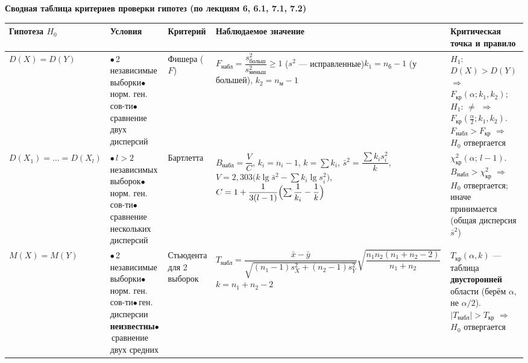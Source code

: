 \documentclass[a4paper,landscape,10pt]{extarticle}
\newcommand{\kr}{\text{кр}}\newcommand{\nab}{\text{набл}}
\newcommand{\bl}{$\bullet$\,}
\begin{document}
\begin{center}{\normalsize\bfseries Сводная таблица критериев проверки гипотез (по лекциям 6, 6.1, 7.1, 7.2)}\end{center}
\vspace{-6pt}
\renewcommand{\arraystretch}{1.12}\footnotesize
\noindent\begin{tabular}{|P{2.3cm}|P{4.6cm}|P{2.2cm}|P{7.1cm}|P{9.2cm}|}
\hline
\textbf{Гипотеза $H_0$} & \textbf{Условия} & \textbf{Критерий} & \textbf{Наблюдаемое значение} & \textbf{Критическая точка и правило} \\\hline
$D(X)=D(Y)$
&\newline\bl 2 независимые выборки\newline\bl норм. ген. сов-ти\newline\bl сравнение двух дисперсий
& Фишера ($F$)
& $F_\nab=\dfrac{s^2_{\text{больш}}}{s^2_{\text{меньш}}}\ge1$ ($s^2$ --- исправленные)\newline $k_1=n_{\text{б}}-1$ (у большей), $k_2=n_{\text{м}}-1$
& $H_1$: $D(X)>D(Y)$ $\Rightarrow$ $F_\kr(\alpha;k_1,k_2)$; \ $H_1$: $\ne$ $\Rightarrow$ $F_\kr(\frac\alpha2;k_1,k_2)$.\newline $F_\nab>F_\kr$ $\Rightarrow$ $H_0$ отвергается \\\hline
$D(X_1)=\dots=D(X_l)$
&\newline\bl $l>2$ независимых выборок\newline\bl норм. ген. сов-ти\newline\bl сравнение нескольких дисперсий
& Бартлетта
& $B_\nab=\dfrac VC$, $k_i=n_i-1$, $k=\sum k_i$, $\bar s^2=\dfrac{\sum k_is_i^2}{k}$,\newline $V=2{,}303\bigl(k\lg\bar s^2-\sum k_i\lg s_i^2\bigr)$, $C=1+\dfrac{1}{3(l-1)}\Bigl(\sum\dfrac1{k_i}-\dfrac1k\Bigr)$
& $\chi^2_\kr(\alpha;\,l-1)$.\newline $B_\nab>\chi^2_\kr$ $\Rightarrow$ $H_0$ отвергается; иначе принимается (общая дисперсия $\bar s^2$) \\\hline
$M(X)=M(Y)$
&\newline\bl 2 независимые выборки\newline\bl норм. ген. сов-ти\newline\bl ген. дисперсии \textbf{неизвестны}\newline\bl сравнение двух средних
& Стьюдента для 2 выборок
& $T_\nab=\dfrac{\bar x-\bar y}{\sqrt{(n_1-1)s_X^2+(n_2-1)s_Y^2}}\sqrt{\dfrac{n_1n_2(n_1+n_2-2)}{n_1+n_2}}$\newline $k=n_1+n_2-2$
& $T_\kr(\alpha,k)$ --- таблица \textbf{двусторонней} области (берём $\alpha$, не $\alpha/2$).\newline $|T_\nab|>T_\kr$ $\Rightarrow$ $H_0$ отвергается \\\hline

\end{tabular}
\end{document}
